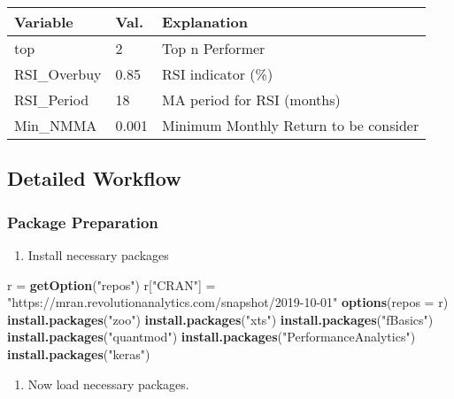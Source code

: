 \documentclass[]{article}
\newenvironment{Shaded}{\begin{snugshade}}{\end{snugshade}}
\newcommand{\DataTypeTok}[1]{\textcolor[rgb]{0.13,0.29,0.53}{#1}}
\newcommand{\KeywordTok}[1]{\textcolor[rgb]{0.13,0.29,0.53}{\textbf{#1}}}
\newcommand{\NormalTok}[1]{#1}
\newcommand{\StringTok}[1]{\textcolor[rgb]{0.31,0.60,0.02}{#1}}
\providecommand{\tightlist}{%
  \setlength{\itemsep}{0pt}\setlength{\parskip}{0pt}}
\begin{document}
\begin{longtable}[]{@{}lll@{}}
\toprule
Variable & Val. & Explanation\tabularnewline
\midrule
\endhead
top & 2 & Top n Performer\tabularnewline
RSI\_Overbuy & 0.85 & RSI indicator (\%)\tabularnewline
RSI\_Period & 18 & MA period for RSI (months)\tabularnewline
Min\_NMMA & 0.001 & Minimum Monthly Return to be consider\tabularnewline
\bottomrule
\end{longtable}

\hypertarget{detailed-workflow}{%
\subsection{Detailed Workflow}\label{detailed-workflow}}

\hypertarget{package-preparation}{%
\subsubsection{Package Preparation}\label{package-preparation}}

\begin{enumerate}
\def\labelenumi{\arabic{enumi}.}
\tightlist
\item
  Install necessary packages
\end{enumerate}

\begin{Shaded}
\begin{Highlighting}[]
\NormalTok{r =}\StringTok{ }\KeywordTok{getOption}\NormalTok{(}\StringTok{"repos"}\NormalTok{)}
\NormalTok{r[}\StringTok{"CRAN"}\NormalTok{] =}\StringTok{ "https://mran.revolutionanalytics.com/snapshot/2019-10-01"}
\KeywordTok{options}\NormalTok{(}\DataTypeTok{repos =}\NormalTok{ r)}
\KeywordTok{install.packages}\NormalTok{(}\StringTok{"zoo"}\NormalTok{)}
\KeywordTok{install.packages}\NormalTok{(}\StringTok{"xts"}\NormalTok{)}
\KeywordTok{install.packages}\NormalTok{(}\StringTok{"fBasics"}\NormalTok{)}
\KeywordTok{install.packages}\NormalTok{(}\StringTok{"quantmod"}\NormalTok{)}
\KeywordTok{install.packages}\NormalTok{(}\StringTok{"PerformanceAnalytics"}\NormalTok{)}
\KeywordTok{install.packages}\NormalTok{(}\StringTok{"keras"}\NormalTok{)}
\end{Highlighting}
\end{Shaded}

\begin{enumerate}
\def\labelenumi{\arabic{enumi}.}
\setcounter{enumi}{1}
\tightlist
\item
  Now load necessary packages.
\end{enumerate}
\end{document}
